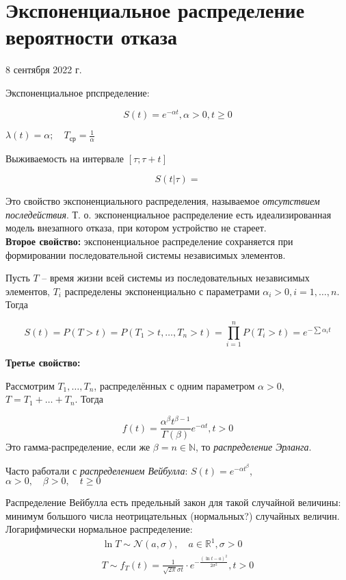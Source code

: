 \documentclass[main.tex]{subfiles}
\begin{document}
\section{Экспоненциальное распределение вероятности отказа}

8 сентября 2022 г.
	
Экспоненциальное рпспределение:

\[ S(t) = e^{ - \alpha t }, \alpha > 0, t \ge 0 \]

$ \lambda(t) = \alpha; \quad T_{\text{ср}} = \frac{1}{\alpha} $

Выживаемость на интервале $ [\tau; \tau + t] $

\[ S(t | \tau) =  \]

Это свойство экспоненциального распределения, называемое \textit{отсутствием последействия}.
Т. о. экспоненциальное распределение есть идеализированная модель внезапного отказа, при котором устройство не стареет. \\

\textbf{Второе свойство:} экспоненциальное распределение сохраняется при формировании последовательной системы независимых элементов.

Пусть $ T $ -- время жизни всей системы из последовательных независимых элементов, $ T_i $ распределены экспоненциально с параметрами $ \alpha_i > 0, i = 1, \dots, n $.
Тогда

\[ S(t) = P(T > t) = P(T_1 > t, \dots, T_n > t) = \prod_{i=1}^n P(T_i > t) = e^{- \sum \alpha_i t} \]

\textbf{ Третье свойство: }

Рассмотрим $ T_1, \dots, T_n $, распределённых с одним параметром $ \alpha > 0 $, $ T = T_1 + \dots + T_n $.
Тогда

\[ f(t) = \frac{\alpha^\beta t^{\beta - 1}}{\Gamma(\beta)} e^{ -\alpha t }, t > 0 \]
Это гамма-распределение, если же $ \beta = n \in \mathds N $, то \textit{распределение Эрланга}.

Часто работали с \emph{распределением Вейбулла}: $ S(t) = e^{- \alpha t^\beta} $, $\alpha > 0, \quad \beta > 0, \quad t \ge 0$

Распределение Вейбулла есть предельный закон для такой случайной величины: минимум большого числа неотрицательных (нормальных?) случайных величин. \\

Логарифмически нормальное распределение:
\begin{gather*}
\ln T \sim \mathcal N(a, \sigma), \quad a \in \mathds R^1, \sigma > 0 \\
T \sim  f_T (t) = \frac{1}{ \sqrt{ 2 \pi } \sigma t } \cdot e^{ - \frac{(\ln t - a )^2}{2 \sigma^2}}, t > 0
\end{gather*}
\end{document}
